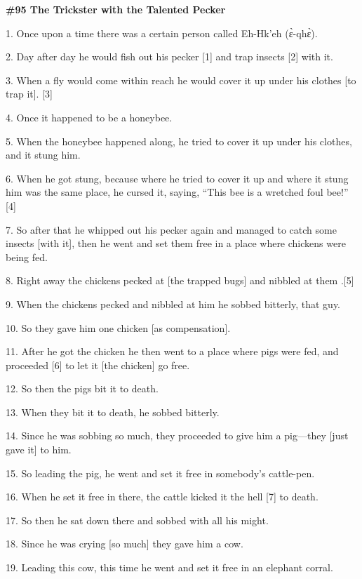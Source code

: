 
{\Large{}\textbf{\#95 The Trickster with the Talented Pecker}}

{\Large{}1. Once upon a time there was a certain person called Eh-Hk'eh (ɛ̀-qhɛ̀).}

{\Large{}2. Day after day he would fish out his pecker [1] and trap insects [2]
with it.}

{\Large{}3. When a fly would come within reach he would cover it up under his clothes
[to trap it]. [3]}

{\Large{}4. Once it happened to be a honeybee.}

{\Large{}5. When the honeybee happened along, he tried to cover it up under his
clothes, and it stung him.}

{\Large{}6. When he got stung, because where he tried to cover it up and where
it stung him was the same place, he cursed it, saying, ``This bee is a wretched
foul bee!'' [4]}

{\Large{}7. So after that he whipped out his pecker again and managed to catch
some insects [with it], then he went and set them free in a place where chickens
were being fed.}

{\Large{}8. Right away the chickens pecked at [the trapped bugs] and nibbled at
them .[5]}

{\Large{}9. When the chickens pecked and nibbled at him he sobbed bitterly, that
guy.}

{\Large{}10. So they gave him one chicken [as compensation].}

{\Large{}11. After he got the chicken he then went to a place where pigs were fed,
and proceeded [6] to let it [the chicken] go free.}

{\Large{}12. So then the pigs bit it to death.}

{\Large{}13. When they bit it to death, he sobbed bitterly.}

{\Large{}14. Since he was sobbing so much, they proceeded to give him a pig---they
[just gave it] to him.}

{\Large{}15. So leading the pig, he went and set it free in somebody's cattle-pen.}

{\Large{}16. When he set it free in there, the cattle kicked it the hell [7] to
death.}

{\Large{}17. So then he sat down there and sobbed with all his might.}

{\Large{}18. Since he was crying [so much] they gave him a cow.}

{\Large{}19. Leading this cow, this time he went and set it free in an elephant
corral.}

